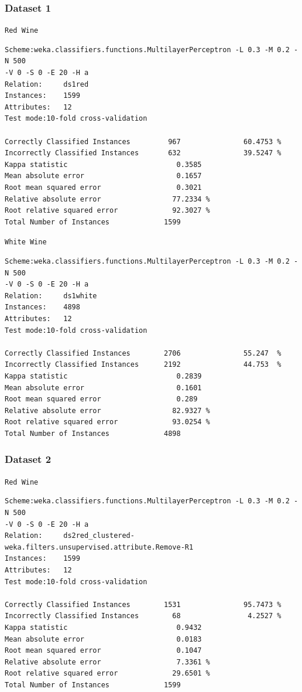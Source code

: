 \documentclass[a4paper,12pt,openany]{report}
\newenvironment{wekaconsole}[1][]{

	\par \noindent
	\begin{samepage}
	\texttt{#1}
	\begin{mdframed}
	\small
	\ttfamily
}{
	\end{mdframed}
	\end{samepage}
}
\begin{document}
\subsubsection*{Dataset 1}
\begin{wekaconsole}[Red Wine]
\begin{verbatim}
Scheme:weka.classifiers.functions.MultilayerPerceptron -L 0.3 -M 0.2 -N 500
-V 0 -S 0 -E 20 -H a
Relation:     ds1red
Instances:    1599
Attributes:   12
Test mode:10-fold cross-validation

Correctly Classified Instances         967               60.4753 %
Incorrectly Classified Instances       632               39.5247 %
Kappa statistic                          0.3585
Mean absolute error                      0.1657
Root mean squared error                  0.3021
Relative absolute error                 77.2334 %
Root relative squared error             92.3027 %
Total Number of Instances             1599
\end{verbatim}
\end{wekaconsole}

\begin{wekaconsole}[White Wine]
\begin{verbatim}
Scheme:weka.classifiers.functions.MultilayerPerceptron -L 0.3 -M 0.2 -N 500
-V 0 -S 0 -E 20 -H a
Relation:     ds1white
Instances:    4898
Attributes:   12
Test mode:10-fold cross-validation

Correctly Classified Instances        2706               55.247  %
Incorrectly Classified Instances      2192               44.753  %
Kappa statistic                          0.2839
Mean absolute error                      0.1601
Root mean squared error                  0.289 
Relative absolute error                 82.9327 %
Root relative squared error             93.0254 %
Total Number of Instances             4898     
\end{verbatim}
\end{wekaconsole}

\subsubsection*{Dataset 2}
\begin{wekaconsole}[Red Wine]
\begin{verbatim}
Scheme:weka.classifiers.functions.MultilayerPerceptron -L 0.3 -M 0.2 -N 500
-V 0 -S 0 -E 20 -H a
Relation:     ds2red_clustered-weka.filters.unsupervised.attribute.Remove-R1
Instances:    1599
Attributes:   12
Test mode:10-fold cross-validation

Correctly Classified Instances        1531               95.7473 %
Incorrectly Classified Instances        68                4.2527 %
Kappa statistic                          0.9432
Mean absolute error                      0.0183
Root mean squared error                  0.1047
Relative absolute error                  7.3361 %
Root relative squared error             29.6501 %
Total Number of Instances             1599
\end{verbatim}
\end{wekaconsole}
\end{document}
